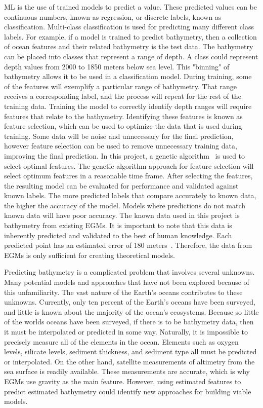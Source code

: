 \par
\ac{ML} is the use of trained models to predict a value.
These predicted values can be continuous numbers, known as regression, or discrete labels, known as classification.
Multi-class classification is used for predicting many different class labels.
For example, if a model is trained to predict bathymetry, then a collection of ocean features and their related bathymetry is the test data.
The bathymetry can be placed into classes that represent a range of depth.
A class could represent depth values from 2000 to 1850 meters below sea level.
This "binning" of bathymetry allows it to be used in a classification model.
During training, some of the features will exemplify a particular range of bathymetry.
That range receives a corresponding label, and the process will repeat for the rest of the training data.
Training the model to correctly identify depth ranges will require features that relate to the bathymetry.
Identifying these features is known as feature selection, which can be used to optimize the data that is used during training.
Some data will be noise and unnecessary for the final prediction, however feature selection can be used to remove unnecessary training data, improving the final prediction.
In this project, a genetic algorithm~\cite{yang1998feature} is used to select optimal features.
The genetic algorithm approach for feature selection will select optimum features in a reasonable time frame.
After selecting the features, the resulting model can be evaluated for performance and validated against known labels.
The more predicted labels that compare accurately to known data, the higher the accuracy of the model.
Models where predictions do not match known data will have poor accuracy.
The known data used in this project is bathymetry from existing \ac{EGM}s.
It is important to note that this data is inherently predicted and validated to the best of human knowledge.
Each predicted point has an estimated error of 180 meters~\cite{becker2009global}.
Therefore, the data from \ac{EGM}s is only sufficient for creating theoretical models.

\par
Predicting bathymetry is a complicated problem that involves several unknowns.
Many potential models and approaches that have not been explored because of this unfamiliarity.
The vast nature of the Earth's oceans contributes to these unknowns.
Currently, only ten percent of the Earth's oceans have been surveyed, and little is known about the majority of the ocean's ecosystems.
Because so little of the worlds oceans have been surveyed, if there is to be bathymetry data, then it must be interpolated or predicted in some way.
Naturally, it is impossible to precisely measure all of the elements in the ocean.
Elements such as oxygen levels, silicate levels, sediment thickness, and sediment type all must be predicted or interpolated.
On the other hand, satellite measurements of altimetry from the sea surface is readily available.
These measurements are accurate, which is why \ac{EGM}s use gravity as the main feature.
However, using estimated features to predict estimated bathymetry could identify new approaches for building viable models.

